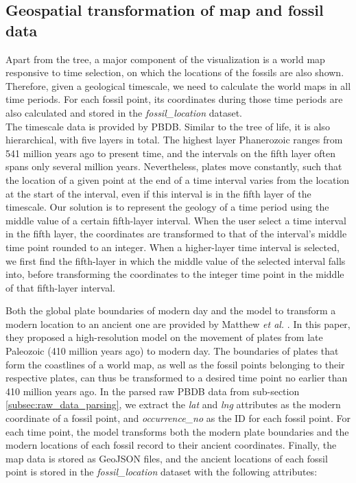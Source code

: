 \documentclass[11pt, a4paper,oneside,chapterprefix=false]{scrbook}
\begin{document}
\subsection{Geospatial transformation of map and fossil data} \label{subsec:geospatial_transformation}
Apart from the tree, a major component of the visualization is a world map responsive to time selection, on which the locations of the fossils are also shown. Therefore, given a geological timescale, we need to calculate the world maps in all time periods. For each fossil point, its coordinates during those time periods are also calculated and stored in the \emph{fossil\_location} dataset. \\

The timescale data is provided by PBDB. Similar to the tree of life, it is also hierarchical, with five layers in total. The highest layer Phanerozoic ranges from 541 million years ago to present time, and the intervals on the fifth layer often spans only several million years. Nevertheless, plates move constantly, such that the location of a given point at the end of a time interval varies from the location at the start of the interval, even if this interval is in the fifth layer of the timescale.  Our solution is to represent the geology of a time period using the middle value of a certain fifth-layer interval. When the user select a time interval in the fifth layer, the coordinates are transformed to that of the interval's middle time point rounded to an integer. When a higher-layer time interval is selected, we first find the fifth-layer in which the middle value of the selected interval falls into, before transforming the coordinates to the integer time point in the middle of that fifth-layer interval. 

Both the global plate boundaries of modern day and the model to transform a modern location to an ancient one are provided by Matthew \emph{et al.} \cite{matthews2016global}. In this paper, they proposed a high-resolution model on the movement of plates from late Paleozoic (410 million years ago) to modern day. The boundaries of plates that form the coastlines of a world map, as well as the fossil points belonging to their respective plates, can thus be transformed to a desired time point no earlier than 410 million years ago. In the parsed raw PBDB data from sub-section \ref{subsec:raw_data_parsing}, we extract the \emph{lat} and \emph{lng} attributes as the modern coordinate of a fossil point, and \emph{occurrence\_no} as the ID for each fossil point. For each time point, the model transforms both the modern plate boundaries and the modern locations of each fossil record to their ancient coordinates. Finally, the map data is stored as GeoJSON files, and the ancient locations of each fossil point is stored in the \emph{fossil\_location} dataset with the following attributes: \\
\end{document}
